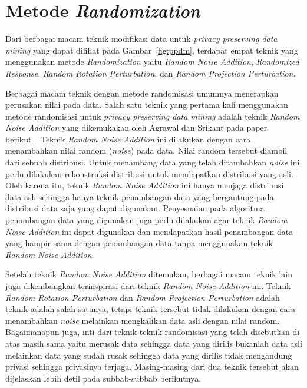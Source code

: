 \section{Metode \textit{Randomization}}
\label{sec:metoderandomization}

Dari berbagai macam teknik modifikasi data untuk \textit{privacy preserving data mining} yang dapat dilihat pada Gambar~\ref{fig:ppdm}, terdapat empat teknik yang menggunakan metode \textit{Randomization} yaitu \textit{Random Noise Addition}, \textit{Randomized Response}, \textit{Random Rotation Perturbation}, dan \textit{Random Projection Perturbation}.

Berbagai macam teknik dengan metode randomisasi umumnya menerapkan perusakan nilai pada data. Salah satu teknik yang pertama kali menggunakan metode randomisasi untuk \textit{privacy preserving data mining} adalah teknik \textit{Random Noise Addition} yang dikemukakan oleh Agrawal dan Srikant pada paper berikut~\cite{agrawalsrikant:00:randomnoise}. Teknik \textit{Random Noise Addition} ini dilakukan dengan cara menambahkan nilai random (\textit{noise}) pada data. Nilai random tersebut diambil dari sebuah distribusi. Untuk menambang data yang telah ditambahkan \textit{noise} ini perlu dilakukan rekonstruksi distribusi untuk mendapatkan distribusi yang asli. Oleh karena itu, teknik \textit{Random Noise Addition} ini hanya menjaga distribusi data asli sehingga hanya teknik penambangan data yang bergantung pada distribusi data saja yang dapat digunakan. Penyesuaian pada algoritma penambangan data yang digunakan juga perlu dilakukan agar teknik \textit{Random Noise Addition} ini dapat digunakan dan mendapatkan hasil penambangan data yang hampir sama dengan penambangan data tanpa menggunakan teknik \textit{Random Noise Addition}.

Setelah teknik \textit{Random Noise Addition} ditemukan, berbagai macam teknik lain juga dikembangkan terinspirasi dari teknik \textit{Random Noise Addition} ini. Teknik \textit{Random Rotation Perturbation} dan \textit{Random Projection Perturbation} adalah teknik adalah salah satunya, tetapi teknik tersebut tidak dilakukan dengan cara menambahkan \textit{noise} melainkan mengkalikan data asli dengan nilai random. Bagaimanapun juga, inti dari teknik-teknik randomisasi yang telah disebutkan di atas masih sama yaitu merusak data sehingga data yang dirilis bukanlah data asli melainkan data yang sudah rusak sehingga data yang dirilis tidak mengandung privasi sehingga privasinya terjaga. Masing-masing dari dua teknik tersebut akan dijelaskan lebih detil pada subbab-subbab berikutnya.


